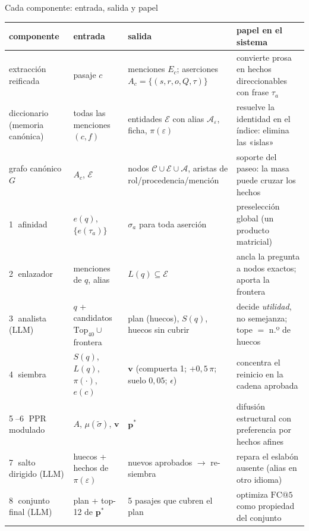 \documentclass[aspectratio=169,10pt]{beamer}
\begin{document}
\begin{frame}{Cada componente: entrada, salida y papel}
\centering\tiny
\setlength{\tabcolsep}{3pt}\renewcommand{\arraystretch}{1.25}
\begin{tabular}{@{}p{23mm}p{33mm}p{33mm}p{44mm}@{}}
\toprule
componente & entrada & salida & papel en el sistema\\
\midrule
extracción reificada & pasaje $c$ & menciones $E_c$; aserciones $A_c=\{(s,r,o,Q,\tau)\}$ & convierte prosa en hechos direccionables con frase $\tau_a$\\
diccionario (memoria canónica) & todas las menciones $(c,f)$ & entidades $\mathcal E$ con alias $\mathcal A_\varepsilon$, ficha, $\pi(\varepsilon)$ & resuelve la identidad en el índice: elimina las «islas»\\
grafo canónico $G$ & $A_c$, $\mathcal E$ & nodos $\mathcal C\cup\mathcal E\cup\mathcal A$, aristas de rol/procedencia/mención & soporte del paseo: la masa puede cruzar los hechos\\
\textcircled{\tiny 1} afinidad & $e(q)$, $\{e(\tau_a)\}$ & $\sigma_a$ para toda aserción & preselección global (un producto matricial)\\
\textcircled{\tiny 2} enlazador & menciones de $q$, alias & $L(q)\subseteq\mathcal E$ & ancla la pregunta a nodos exactos; aporta la frontera\\
\textcircled{\tiny 3} analista (LLM) & $q$ + candidatos $\mathrm{Top}_{40}\cup$ frontera & plan (huecos), $S(q)$, huecos sin cubrir & decide \emph{utilidad}, no semejanza; tope $=$ n.º de huecos\\
\textcircled{\tiny 4} siembra & $S(q)$, $L(q)$, $\pi(\cdot)$, $e(c)$ & $\mathbf v$ (compuerta 1; $+0{,}5\,\pi$; suelo $0{,}05$; $\epsilon$) & concentra el reinicio en la cadena aprobada\\
\textcircled{\tiny 5}--\textcircled{\tiny 6} PPR modulado & $A$, $\mu(\tilde\sigma)$, $\mathbf v$ & $\mathbf p^{*}$ & difusión estructural con preferencia por hechos afines\\
\textcircled{\tiny 7} salto dirigido (LLM) & huecos + hechos de $\pi(\varepsilon)$ & nuevos aprobados $\to$ re-siembra & repara el eslabón ausente (alias en otro idioma)\\
\textcircled{\tiny 8} conjunto final (LLM) & plan + top-12 de $\mathbf p^{*}$ & 5 pasajes que cubren el plan & optimiza $\mathrm{FC@}5$ como propiedad del conjunto\\
\bottomrule
\end{tabular}
\end{frame}
\end{document}
